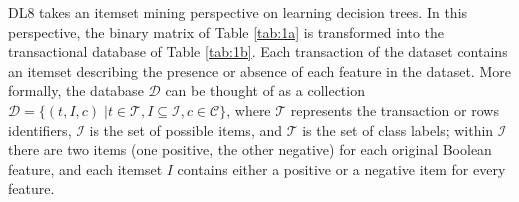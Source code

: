 DL8 takes an itemset mining perspective on learning decision trees. In this perspective, the binary matrix of Table \ref{tab:1a} is transformed into the transactional database of Table \ref{tab:1b}. Each transaction of the dataset contains an itemset describing the presence or absence of each feature in the dataset. More formally, the database $\mathcal{D}$ can be thought of as a collection $\mathcal{D} = \{(t, I, c)\;|t\in \mathcal{T} , I \subseteq \mathcal{I}, c \in \mathcal{C}\}$, where $\mathcal{T}$ represents the transaction or rows identifiers, $\mathcal{I}$ is the set of possible items, and $\mathcal{T}$ is the set of class labels; within $\mathcal{I}$ there are two items (one positive, the other negative) for each original Boolean feature, and each itemset $I$ contains either a positive or a negative item for every feature.
\begin{table}[!ht]
	\centering
	~
	\caption{Example database}
	\label{tab:1}
\end{table}

